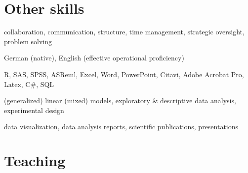 \documentclass[11pt, a4paper]{awesome-cv}
\begin{document}
\hypertarget{other-skills}{%
\section{Other skills}\label{other-skills}}

\begin{cvskills}

  {collaboration, communication, structure, time management, strategic oversight, problem solving} 
  
  {German (native), English (effective operational proficiency)}
  
  {R, SAS, SPSS, ASReml, Excel, Word, PowerPoint, Citavi, Adobe Acrobat Pro, Latex, C\#, SQL} 
  
  {(generalized) linear (mixed) models, exploratory \& descriptive data analysis, experimental design} 
  
  {data visualization, data analysis reports, scientific publications, presentations} 
  

\end{cvskills}

\hypertarget{teaching}{%
\section{Teaching}\label{teaching}}
\end{document}
